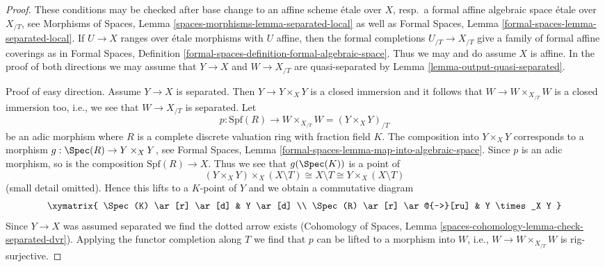 \begin{proof}
These conditions may be checked after base change to an affine
scheme \'etale over $X$, resp.\ a formal affine algebraic space
\'etale over $X_{/T}$, see
Morphisms of Spaces, Lemma \ref{spaces-morphisms-lemma-separated-local}
as well as
Formal Spaces, Lemma \ref{formal-spaces-lemma-separated-local}.
If $U \to X$ ranges over \'etale morphisms with $U$ affine, then
the formal completions $U_{/T} \to X_{/T}$ give a family
of formal affine coverings as in Formal Spaces, Definition
\ref{formal-spaces-definition-formal-algebraic-space}.
Thus we may and do assume $X$ is affine.
In the proof of both directions we may assume that $Y \to X$ and
$W \to X_{/T}$ are quasi-separated by
Lemma \ref{lemma-output-quasi-separated}.

\medskip\noindent
Proof of easy direction. Assume $Y \to X$ is separated.
Then $Y \to Y \times_X Y$ is a closed immersion and it follows that
$W \to W \times_{X_{/T}} W$ is a closed immersion too, i.e., we see
that $W \to X_{/T}$ is separated. Let
$$
p : \text{Spf}(R) \longrightarrow W \times_{X_{/T}} W = (Y \times_X Y)_{/T}
$$
be an adic morphism where $R$ is a complete discrete valuation ring with
fraction field $K$. The composition into $Y \times_X Y$ corresponds to
a morphism $g : \Spec(R) \to Y \times_X Y$, see
Formal Spaces, Lemma \ref{formal-spaces-lemma-map-into-algebraic-space}.
Since $p$ is an adic morphism, so is the composition $\text{Spf}(R) \to X$.
Thus we see that $g(\Spec(K))$ is a point of
$$
(Y \times_X Y) \times_X (X \setminus T) \cong
X \setminus T \cong
Y \times_X (X \setminus T)
$$
(small detail omitted). Hence this lifts to a $K$-point of $Y$ and
we obtain a commutative diagram
$$
\xymatrix{
\Spec(K) \ar[r] \ar[d] & Y \ar[d] \\
\Spec(R) \ar[r] \ar@{-->}[ru] & Y \times_X Y
}
$$
Since $Y \to X$ was assumed separated we find the dotted arrow exists
(Cohomology of Spaces, Lemma
\ref{spaces-cohomology-lemma-check-separated-dvr}).
Applying the functor completion along $T$ we find that $p$ can be
lifted to a morphism into $W$, i.e., $W \to W \times_{X_{/T}} W$ is
rig-surjective.


\end{proof}

